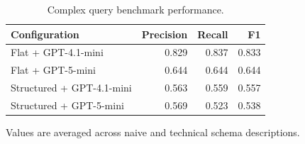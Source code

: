 \begin{table}[htbp]
\centering
\small
\caption{Complex query benchmark performance.}
\label{tab:complex-query-results}
\begin{tabular}{lrrr}
\toprule
Configuration & Precision & Recall & F1 \\
\midrule
Flat + GPT-4.1-mini & 0.829 & 0.837 & 0.833 \\
Flat + GPT-5-mini & 0.644 & 0.644 & 0.644 \\
Structured + GPT-4.1-mini & 0.563 & 0.559 & 0.557 \\
Structured + GPT-5-mini & 0.569 & 0.523 & 0.538 \\
\bottomrule
\end{tabular}
\par\footnotesize{Values are averaged across naive and technical schema descriptions.}
\end{table}
